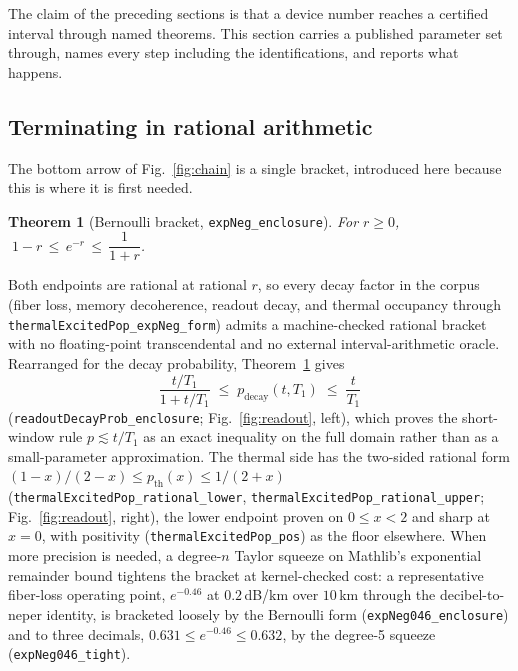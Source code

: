 \documentclass[aps,pra,reprint,nofootinbib,superscriptaddress]{revtex4-2}
\theoremstyle{plain}
\newtheorem{theorem}{Theorem}
\theoremstyle{definition}
\theoremstyle{remark}
\newcommand{\lean}[1]{\texttt{#1}}
\begin{document}
The claim of the preceding sections is that a device number reaches a
certified interval through named theorems. This section carries a
published parameter set through, names every step including the
identifications, and reports what happens.

\subsection{Terminating in rational arithmetic}

The bottom arrow of Fig.~\ref{fig:chain} is a single bracket, introduced
here because this is where it is first needed.

\begin{theorem}[Bernoulli bracket, \lean{expNeg\_enclosure}]
\label{thm:bernoulli}
For $r \ge 0$,
$\;1 - r \,\le\, e^{-r} \,\le\, \dfrac{1}{1+r}$.
\end{theorem}

Both endpoints are rational at rational $r$, so every decay factor in the
corpus (fiber loss, memory decoherence, readout decay, and thermal
occupancy through \lean{thermalExcitedPop\_expNeg\_form}) admits a
machine-checked rational bracket with no floating-point transcendental
and no external interval-arithmetic oracle. Rearranged for the decay
probability, Theorem~\ref{thm:bernoulli} gives
\[
\frac{t/T_1}{1+t/T_1} \;\le\; p_{\mathrm{decay}}(t,T_1)
\;\le\; \frac{t}{T_1}
\]
(\lean{readoutDecayProb\_enclosure}; Fig.~\ref{fig:readout}, left), which
proves the short-window rule $p \lesssim t/T_1$ as an exact inequality on
the full domain rather than as a small-parameter approximation. The
thermal side has the two-sided rational form
$(1-x)/(2-x) \le p_{\mathrm{th}}(x) \le 1/(2+x)$
(\lean{thermalExcitedPop\_rational\_lower},
\lean{thermalExcitedPop\_rational\_upper}; Fig.~\ref{fig:readout},
right), the lower endpoint proven on $0 \le x < 2$ and sharp at $x=0$,
with positivity (\lean{thermalExcitedPop\_pos}) as the floor elsewhere.
When more precision is needed, a degree-$n$ Taylor squeeze on Mathlib's
exponential remainder bound tightens the bracket at kernel-checked cost:
a representative fiber-loss operating point, $e^{-0.46}$ at $0.2$\,dB/km
over $10$\,km through the decibel-to-neper identity, is bracketed loosely
by the Bernoulli form (\lean{expNeg046\_enclosure}) and to three
decimals, $0.631 \le e^{-0.46} \le 0.632$, by the degree-5 squeeze
(\lean{expNeg046\_tight}).
\end{document}
